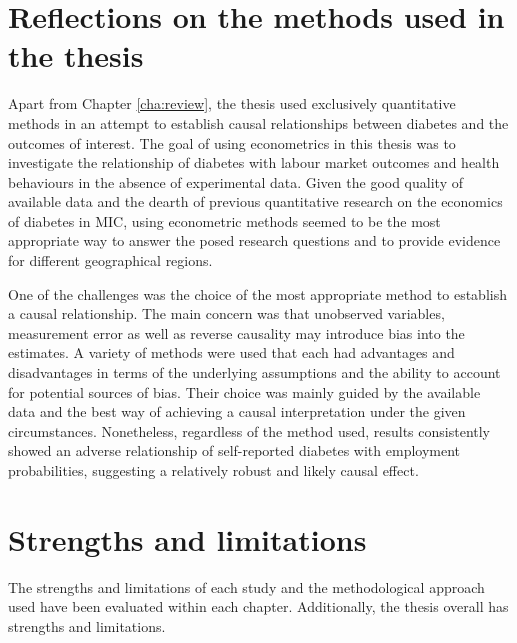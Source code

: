 \section{Reflections on the methods used in the thesis}

Apart from Chapter \ref{cha:review}, the thesis used exclusively quantitative methods in an attempt to establish causal relationships between diabetes and the outcomes of interest. The goal of using econometrics in this thesis was to investigate the relationship of diabetes with labour market outcomes and health behaviours in the absence of experimental data. Given the good quality of available data and the dearth of previous quantitative research on the economics of diabetes in \ac{MIC}, using econometric methods seemed to be the most appropriate way to answer the posed research questions and to provide evidence for different geographical regions.

One of the challenges was the choice of the most appropriate method to establish a causal relationship. The main concern was that unobserved variables, measurement error as well as reverse causality may introduce bias into the estimates. A variety of methods were used that each had advantages and disadvantages in terms of the underlying assumptions and the ability to account for potential sources of bias. Their choice was mainly guided by the available data and the best way of achieving a causal interpretation under the given circumstances. Nonetheless, regardless of the method used, results consistently showed an adverse relationship of self-reported diabetes with employment probabilities, suggesting a relatively robust and likely causal effect.

\section{Strengths and limitations}

The strengths and limitations of each study and the methodological approach used have been evaluated within each chapter. Additionally, the thesis overall has strengths and limitations.


